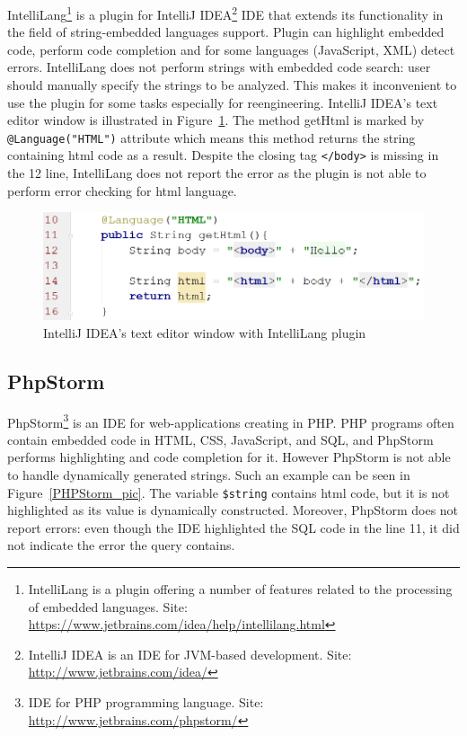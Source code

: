 \documentclass{sig-alternate-05-2015}
\begin{document}
IntelliLang\footnote{IntelliLang is a plugin offering a number of features related to the processing of embedded languages. Site: \url{https://www.jetbrains.com/idea/help/intellilang.html}} is a plugin for  IntelliJ IDEA\footnote{IntelliJ IDEA is an IDE for JVM-based development. Site: \url{http://www.jetbrains.com/idea/}} IDE that extends its functionality in the field of string-embedded languages support. Plugin can highlight embedded code, perform code completion and for some languages (JavaScript, XML) detect errors. IntelliLang does not perform strings with embedded code search: user should manually specify the strings to be analyzed. This makes it inconvenient to use the plugin for some tasks especially for reengineering. IntelliJ IDEA's text editor window is illustrated in Figure~\ref{IntelliLang_pic}. The method getHtml is marked by \verb|@Language("HTML")| attribute which means this method returns the string containing html code as a result. Despite the closing tag \verb|</body>| is missing in the 12 line, IntelliLang does not report the error as the plugin is not able to perform error checking for html language.

\begin{figure}[h!]
    \begin{center}
        \includegraphics[scale=0.35]{Figures/IntelliLang.PNG}
    \end{center}
    \caption{IntelliJ IDEA's text editor window with IntelliLang plugin}
    \label{IntelliLang_pic}
\end{figure} 

\subsection{PhpStorm}

PhpStorm\footnote{IDE for PHP programming language. Site: \url{http://www.jetbrains.com/phpstorm/}} is an IDE for web-applications creating in PHP. PHP programs often contain embedded code in HTML, CSS, JavaScript, and SQL, and PhpStorm performs highlighting and code completion for it. However PhpStorm is not able to handle dynamically generated strings. Such an example can be seen in Figure~\ref{PHPStorm_pic}. The variable \verb|$string| contains html code, but it is not highlighted as its value is dynamically constructed. Moreover, PhpStorm does not report errors: even though the IDE highlighted the SQL code in the line 11, it did not indicate the error the query contains.
\end{document}
